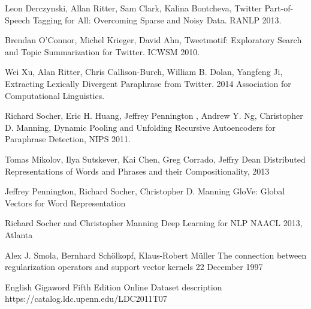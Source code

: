 \documentclass[conference]{IEEEtran}
\begin{document}
%
%
%
\begin{thebibliography}{1}

Leon Derczynski, Allan Ritter, Sam Clark, Kalina Bontcheva, 
Twitter Part-of-Speech Tagging for All: Overcoming Sparse and Noisy Data.
RANLP 2013.

Brendan O’Connor, Michel Krieger, David Ahn,
Tweetmotif: Exploratory Search and Topic Summarization for Twitter.
ICWSM 2010.

Wei Xu, Alan Ritter, Chris Callison-Burch, William B. Dolan, Yangfeng Ji, 
Extracting Lexically Divergent Paraphrase from Twitter. 
2014 Association for Computational Linguistics.

Richard Socher, Eric H. Huang, Jeffrey Pennington
, Andrew Y. Ng, Christopher D. Manning, Dynamic Pooling and Unfolding Recursive
Autoencoders for Paraphrase Detection, NIPS 2011.

Tomas Mikolov, Ilya Sutskever, Kai Chen,
Greg Corrado, Jeffry Dean
Distributed Representations of Words and Phrases
and their Compositionality, 2013

Jeffrey Pennington, Richard Socher, Christopher D. Manning
GloVe: Global Vectors for Word Representation

Richard Socher and Christopher Manning
Deep	 Learning for NLP
NAACL 2013, Atlanta

Alex J. Smola, Bernhard Sch{\"o}lkopf, Klaus-Robert M{\"u}ller
The connection between regularization operators and support vector kernels
 22 December 1997

English Gigaword Fifth Edition
Online Dataset description
https://catalog.ldc.upenn.edu/LDC2011T07

\end{thebibliography}




\end{document}
